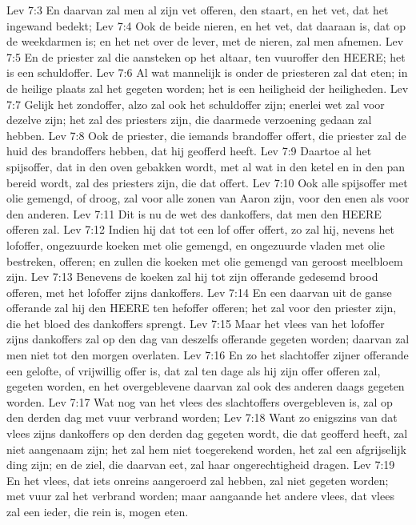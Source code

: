 Lev 7:3  En daarvan zal men al zijn vet offeren, den staart, en het vet, dat het ingewand bedekt;
Lev 7:4  Ook de beide nieren, en het vet, dat daaraan is, dat op de weekdarmen is; en het net over de lever, met de nieren, zal men afnemen.
Lev 7:5  En de priester zal die aansteken op het altaar, ten vuuroffer den HEERE; het is een schuldoffer.
Lev 7:6  Al wat mannelijk is onder de priesteren zal dat eten; in de heilige plaats zal het gegeten worden; het is een heiligheid der heiligheden.
Lev 7:7  Gelijk het zondoffer, alzo zal ook het schuldoffer zijn; enerlei wet zal voor dezelve zijn; het zal des priesters zijn, die daarmede verzoening gedaan zal hebben.
Lev 7:8  Ook de priester, die iemands brandoffer offert, die priester zal de huid des brandoffers hebben, dat hij geofferd heeft.
Lev 7:9  Daartoe al het spijsoffer, dat in den oven gebakken wordt, met al wat in den ketel en in den pan bereid wordt, zal des priesters zijn, die dat offert.
Lev 7:10  Ook alle spijsoffer met olie gemengd, of droog, zal voor alle zonen van Aaron zijn, voor den enen als voor den anderen.
Lev 7:11  Dit is nu de wet des dankoffers, dat men den HEERE offeren zal.
Lev 7:12  Indien hij dat tot een lof offer offert, zo zal hij, nevens het lofoffer, ongezuurde koeken met olie gemengd, en ongezuurde vladen met olie bestreken, offeren; en zullen die koeken met olie gemengd van geroost meelbloem zijn.
Lev 7:13  Benevens de koeken zal hij tot zijn offerande gedesemd brood offeren, met het lofoffer zijns dankoffers.
Lev 7:14  En een daarvan uit de ganse offerande zal hij den HEERE ten hefoffer offeren; het zal voor den priester zijn, die het bloed des dankoffers sprengt.
Lev 7:15  Maar het vlees van het lofoffer zijns dankoffers zal op den dag van deszelfs offerande gegeten worden; daarvan zal men niet tot den morgen overlaten.
Lev 7:16  En zo het slachtoffer zijner offerande een gelofte, of vrijwillig offer is, dat zal ten dage als hij zijn offer offeren zal, gegeten worden, en het overgeblevene daarvan zal ook des anderen daags gegeten worden.
Lev 7:17  Wat nog van het vlees des slachtoffers overgebleven is, zal op den derden dag met vuur verbrand worden;
Lev 7:18  Want zo enigszins van dat vlees zijns dankoffers op den derden dag gegeten wordt, die dat geofferd heeft, zal niet aangenaam zijn; het zal hem niet toegerekend worden, het zal een afgrijselijk ding zijn; en de ziel, die daarvan eet, zal haar ongerechtigheid dragen.
Lev 7:19  En het vlees, dat iets onreins aangeroerd zal hebben, zal niet gegeten worden; met vuur zal het verbrand worden; maar aangaande het andere vlees, dat vlees zal een ieder, die rein is, mogen eten.
